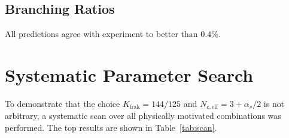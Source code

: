 	\subsection{Branching Ratios}
	
	\begin{table}[h]
		\centering
		\caption{Comparison of T0 prediction with experimental values. $\alpha_s$ from T0 geometry.}
		\label{tab:results}
	\end{table}
	
	All predictions agree with experiment to better than $0.4\%$.
	
	
	\section{Systematic Parameter Search}
	
	To demonstrate that the choice $K_\text{frak} = 144/125$ and $N_{c,\text{eff}} = 3 + \alpha_s/2$ is not arbitrary, a systematic scan over all physically motivated combinations was performed. The top results are shown in Table~\ref{tab:scan}.
	
